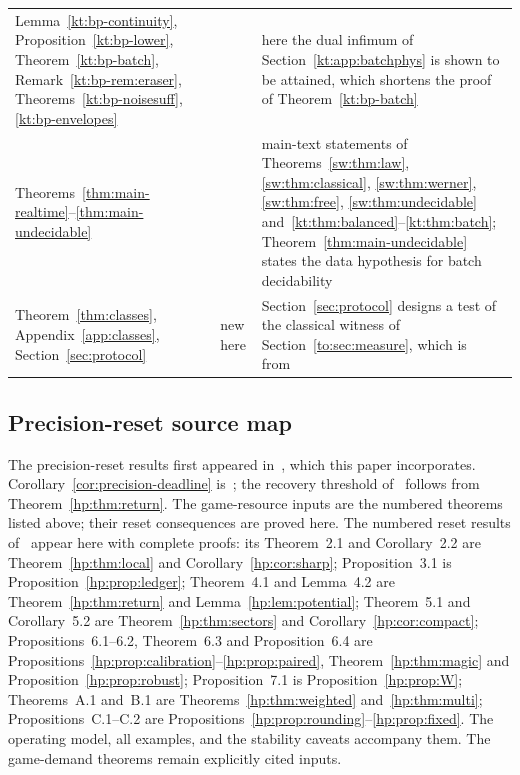 \begin{small}
\begin{longtable}{@{}>{\raggedright\arraybackslash}p{}>{\raggedright\arraybackslash}p{}>{\raggedright\arraybackslash}p{}@{}}
Lemma~\ref{kt:bp-continuity}, Proposition~\ref{kt:bp-lower}, Theorem~\ref{kt:bp-batch}, Remark~\ref{kt:bp-rem:eraser}, Theorems~\ref{kt:bp-noisesuff}, \ref{kt:bp-envelopes} & \cite[Lemma~18, Prop.~19, Thm.~20, Remark~1, Thms.~21, 22]{KeepingTime} & here the dual infimum of Section~\ref{kt:app:batchphys} is shown to be attained, which shortens the proof of Theorem~\ref{kt:bp-batch}\\
Theorems~\ref{thm:main-realtime}--\ref{thm:main-undecidable} & \cite{SaveWork,KeepingTime} & main-text statements of Theorems~\ref{sw:thm:law}, \ref{sw:thm:classical}, \ref{sw:thm:werner}, \ref{sw:thm:free}, \ref{sw:thm:undecidable} and~\ref{kt:thm:balanced}--\ref{kt:thm:batch}; Theorem~\ref{thm:main-undecidable} states the data hypothesis for batch decidability\\
Theorem~\ref{thm:classes}, Appendix~\ref{app:classes}, Section~\ref{sec:protocol} & new here & Section~\ref{sec:protocol} designs a test of the classical witness of Section~\ref{to:sec:measure}, which is from~\cite[Sec.~8]{Order}\\
\end{longtable}
\end{small}

\subsection*{Precision-reset source map}
The precision-reset results first appeared in~\cite{HPheat}, which this paper incorporates. Corollary~\ref{cor:precision-deadline} is~\cite[Corollary~13.1]{HPuncomputable}; the recovery threshold of~\cite[Corollary~13.2]{HPuncomputable} follows from Theorem~\ref{hp:thm:return}. The game-resource inputs are the numbered theorems listed above; their reset consequences are proved here.
The numbered reset results of~\cite{HPheat} appear here with complete proofs: its Theorem~2.1 and Corollary~2.2 are Theorem~\ref{hp:thm:local} and Corollary~\ref{hp:cor:sharp}; Proposition~3.1 is Proposition~\ref{hp:prop:ledger}; Theorem~4.1 and Lemma~4.2 are Theorem~\ref{hp:thm:return} and Lemma~\ref{hp:lem:potential}; Theorem~5.1 and Corollary~5.2 are Theorem~\ref{hp:thm:sectors} and Corollary~\ref{hp:cor:compact}; Propositions~6.1--6.2, Theorem~6.3 and Proposition~6.4 are Propositions~\ref{hp:prop:calibration}--\ref{hp:prop:paired}, Theorem~\ref{hp:thm:magic} and Proposition~\ref{hp:prop:robust}; Proposition~7.1 is Proposition~\ref{hp:prop:W}; Theorems~A.1 and~B.1 are Theorems~\ref{hp:thm:weighted} and~\ref{hp:thm:multi}; Propositions~C.1--C.2 are Propositions~\ref{hp:prop:rounding}--\ref{hp:prop:fixed}. The operating model, all examples, and the stability caveats accompany them. The game-demand theorems remain explicitly cited inputs.
